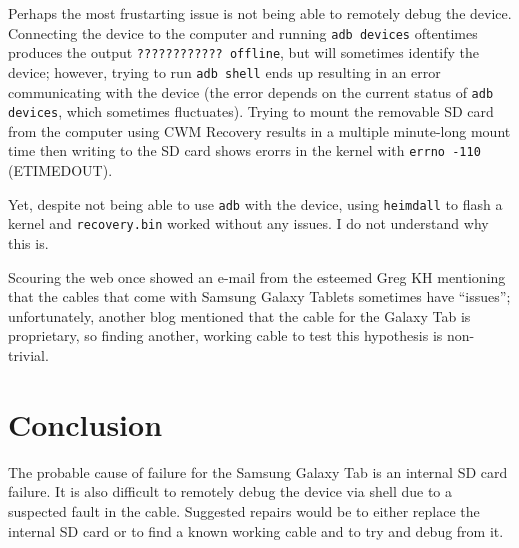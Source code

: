 \documentclass{article}
\begin{document}
Perhaps the most frustarting issue is not being able to remotely debug the device. Connecting the device to the computer and running \texttt{adb devices} oftentimes produces the output \texttt{????????????    offline}, but will sometimes identify the device; however, trying to run \texttt{adb shell} ends up resulting in an error communicating with the device (the error depends on the current status of \texttt{adb devices}, which sometimes fluctuates). Trying to mount the removable SD card from the computer using CWM Recovery results in a multiple minute-long mount time then writing to the SD card shows erorrs in the kernel with \texttt{errno -110} (ETIMEDOUT).

Yet, despite not being able to use \texttt{adb} with the device, using \texttt{heimdall} to flash a kernel and \texttt{recovery.bin} worked without any issues. I do not understand why this is.

Scouring the web once showed an e-mail from the esteemed Greg KH mentioning that the cables that come with Samsung Galaxy Tablets sometimes have ``issues''; unfortunately, another blog mentioned that the cable for the Galaxy Tab is proprietary, so finding another, working cable to test this hypothesis is non-trivial.

\section{Conclusion}

The probable cause of failure for the Samsung Galaxy Tab is an internal SD card failure. It is also difficult to remotely debug the device via shell due to a suspected fault in the cable. Suggested repairs would be to either replace the internal SD card or to find a known working cable and to try and debug from it.
\end{document}
